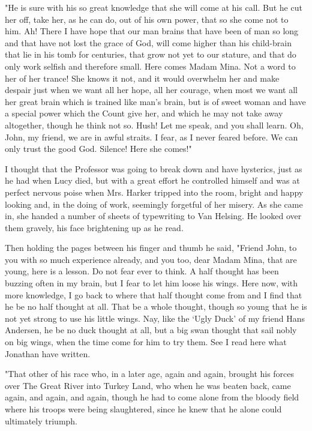 "He is sure with his so great knowledge that she will come at his call. But he cut her off, take her, as he can do, out of his own power, that so she come not to him. Ah! There I have hope that our man brains that have been of man so long and that have not lost the grace of God, will come higher than his child-brain that lie in his tomb for centuries, that grow not yet to our stature, and that do only work selfish and therefore small. Here comes Madam Mina. Not a word to her of her trance! She knows it not, and it would overwhelm her and make despair just when we want all her hope, all her courage, when most we want all her great brain which is trained like man's brain, but is of sweet woman and have a special power which the Count give her, and which he may not take away altogether, though he think not so. Hush! Let me speak, and you shall learn. Oh, John, my friend, we are in awful straits. I fear, as I never feared before. We can only trust the good God. Silence! Here she comes!" 

I thought that the Professor was going to break down and have hysterics, just as he had when Lucy died, but with a great effort he controlled himself and was at perfect nervous poise when Mrs. Harker tripped into the room, bright and happy looking and, in the doing of work, seemingly forgetful of her misery. As she came in, she handed a number of sheets of typewriting to Van Helsing. He looked over them gravely, his face brightening up as he read. 

Then holding the pages between his finger and thumb he said, "Friend John, to you with so much experience already, and you too, dear Madam Mina, that are young, here is a lesson. Do not fear ever to think. A half thought has been buzzing often in my brain, but I fear to let him loose his wings. Here now, with more knowledge, I go back to where that half thought come from and I find that he be no half thought at all. That be a whole thought, though so young that he is not yet strong to use his little wings. Nay, like the `Ugly Duck' of my friend Hans Andersen, he be no duck thought at all, but a big swan thought that sail nobly on big wings, when the time come for him to try them. See I read here what Jonathan have written. 

"That other of his race who, in a later age, again and again, brought his forces over The Great River into Turkey Land, who when he was beaten back, came again, and again, and again, though he had to come alone from the bloody field where his troops were being slaughtered, since he knew that he alone could ultimately triumph. 

